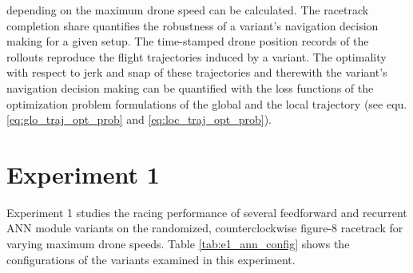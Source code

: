 depending on the maximum drone speed
can be calculated.
The racetrack completion share quantifies
the robustness of a variant's navigation decision making 
for a given setup.
The time-stamped drone position records of the rollouts
reproduce the flight trajectories induced by a variant.
The optimality with respect to jerk and snap
of these trajectories and therewith the 
variant's navigation decision making 
can be quantified
with the loss functions of the optimization problem formulations
of the global and the local trajectory
(see equ. \ref{eq:glo_traj_opt_prob} and \ref{eq:loc_traj_opt_prob}).









\section{Experiment 1}
Experiment 1 studies the racing performance of 
several feedforward and recurrent ANN module variants 
on the randomized, counterclockwise figure-8 racetrack
for varying maximum drone speeds.
Table \ref{tab:e1_ann_config} shows 
the configurations of the variants examined in this experiment.
\providecommand{\ncols}{}\renewcommand{\ncols}{8}
\providecommand{\wcols}{}\renewcommand{\wcols}{1.3cm}
